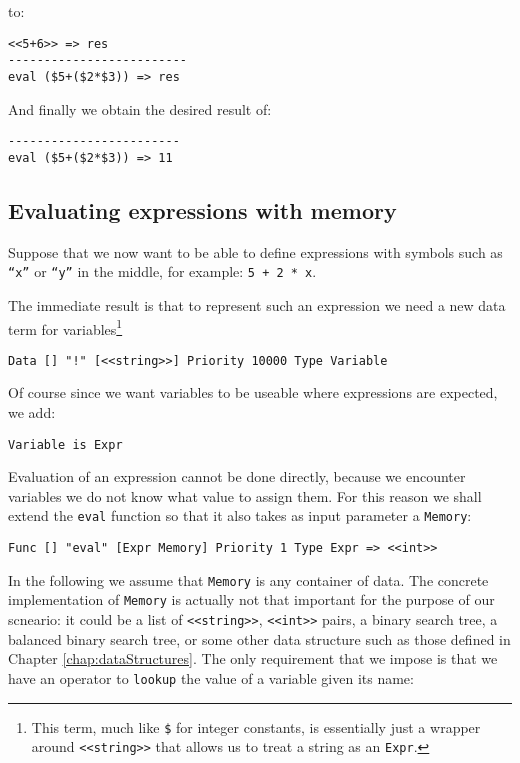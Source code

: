 to:

\begin{lstlisting}
<<5+6>> => res
-------------------------
eval ($5+($2*$3)) => res
\end{lstlisting}

And finally we obtain the desired result of:

\begin{lstlisting}
------------------------
eval ($5+($2*$3)) => 11
\end{lstlisting}

\subsection{Evaluating expressions with memory}

Suppose that we now want to be able to define expressions with symbols such as \texttt{``x''} or \texttt{``y''} in the middle, for example: \texttt{5 + 2 * x}.

The immediate result is that to represent such an expression we need a new data term for variables\footnote{This term, much like \texttt{\$} for integer constants, is essentially just a wrapper around \texttt{<<string>>} that allows us to treat a string as an \texttt{Expr}.}

\begin{lstlisting}
Data [] "!" [<<string>>] Priority 10000 Type Variable
\end{lstlisting}

Of course since we want variables to be useable where expressions are expected, we add:

\begin{lstlisting}
Variable is Expr
\end{lstlisting}

Evaluation of an expression cannot be done directly, because we encounter variables we do not know what value to assign them. For this reason we shall extend the \texttt{eval} function so that it also takes as input parameter a \texttt{Memory}:

\begin{lstlisting}
Func [] "eval" [Expr Memory] Priority 1 Type Expr => <<int>>
\end{lstlisting}

In the following we assume that \texttt{Memory} is any container of data. The concrete implementation of \texttt{Memory} is actually not that important for the purpose of our scneario: it could be a list of \texttt{<<string>>}, \texttt{<<int>>} pairs, a binary search tree, a balanced binary search tree, or some other data structure such as those defined in Chapter \ref{chap:dataStructures}. The only requirement that we impose is that we have an operator to \texttt{lookup} the value of a variable given its name:

